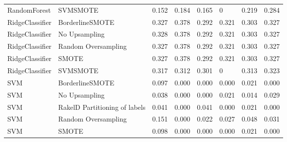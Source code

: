 \begin{tabular}{llllllll}
                   RandomForest &                      SVMSMOTE & 0.152 &                     0.184 &                 0.165 &                      0 &                                   0.219 &     0.284 \\
                RidgeClassifier &               BorderlineSMOTE & 0.327 &                     0.378 &                 0.292 &                  0.321 &                                   0.303 &     0.327 \\
                RidgeClassifier &                 No Upsampling & 0.328 &                     0.378 &                 0.292 &                  0.321 &                                   0.303 &     0.327 \\
                RidgeClassifier &           Random Oversampling & 0.327 &                     0.378 &                 0.292 &                  0.321 &                                   0.303 &     0.327 \\
                RidgeClassifier &                         SMOTE & 0.327 &                     0.378 &                 0.292 &                  0.321 &                                   0.303 &     0.327 \\
                RidgeClassifier &                      SVMSMOTE & 0.317 &                     0.312 &                 0.301 &                      0 &                                   0.313 &     0.323 \\
                            SVM &               BorderlineSMOTE & 0.097 &                     0.000 &                 0.000 &                  0.000 &                                   0.021 &     0.000 \\
                            SVM &                 No Upsampling & 0.038 &                     0.000 &                 0.000 &                  0.021 &                                   0.014 &     0.029 \\
                            SVM & RakelD Partitioning of labels & 0.041 &                     0.000 &                 0.041 &                  0.000 &                                   0.021 &     0.000 \\
                            SVM &           Random Oversampling & 0.151 &                     0.000 &                 0.022 &                  0.027 &                                   0.048 &     0.031 \\
                            SVM &                         SMOTE & 0.098 &                     0.000 &                 0.000 &                  0.000 &                                   0.021 &     0.000 \\

\end{tabular}
